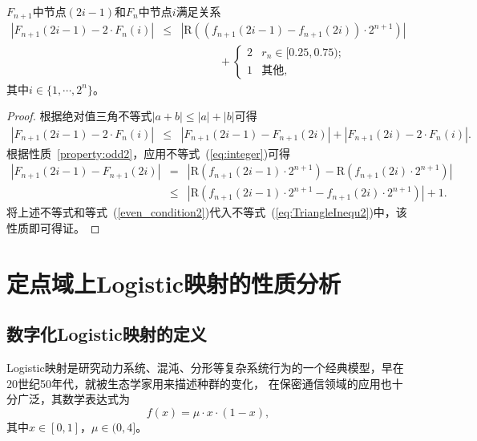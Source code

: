 \begin{Property}
\label{property:odd2}
$F_{n+1}$中节点$(2i-1)$和$F_{n}$中节点$i$满足关系
\begin{eqnarray}
\left|F_{n+1}(2i-1)-2\cdot F_{n}(i)\right|
& \le &    \left|\mathrm{R}\left( (f_{n+1}(2i-1)
                    -f_{n+1}(2i))\cdot 2^{n+1} \right)\right|\nonumber\\
&     &    \hspace{1cm}
\quad+\begin{cases}
2  & r_n\in [0.25, 0.75);\\
1  & \text{其他},
\end{cases}
\end{eqnarray}
其中$i\in \{1, \cdots, 2^n\}$。
\end{Property}
\begin{proof}
根据绝对值三角不等式$|a+b|\le |a|+|b|$可得
\begin{eqnarray}
\left|F_{n+1}(2i\!-\!1)\!-\!2\cdot F_n(i)\right|
& \le &   \left|F_{n+1}(2i\!-\!1)\!-\!F_{n+1}(2i)\right|\!+\!|F_{n+1}(2i)\!-\!2\cdot F_n(i)|.
\label{eq:TriangleInequ2}
\end{eqnarray}
根据性质~\ref{property:odd2}，应用不等式~(\ref{eq:integer})可得
\begin{eqnarray}
\left|F_{n+1}(2i\!-\!1)\!-\!F_{n+1}(2i)\right|
& =   &  \left| \mathrm{R}\left(f_{n+1}(2i\!-\!1)\cdot 2^{n+1}\right)
                \!-\!\mathrm{R}\left(f_{n+1}(2i)\cdot 2^{n+1}\right) \right| \nonumber \\
& \le &  \left| \mathrm{R}\left(f_{n+1}(2i\!-\!1)\cdot 2^{n+1}
                \!-\!f_{n+1}(2i)\cdot 2^{n+1}\right) \right| \!+\!1.  \label{uppound}
\end{eqnarray}
将上述不等式和等式~(\ref{even_condition2})代入不等式~(\ref{eq:TriangleInequ2})中，该性质即可得证。\qedsymbol
\end{proof}

\section{定点域上Logistic映射的性质分析}

\subsection{数字化Logistic映射的定义}

Logistic映射是研究动力系统、混沌、分形等复杂系统行为的一个经典模型，早在20世纪50年代，就被生态学家用来描述种群的变化，
在保密通信领域的应用也十分广泛，其数学表达式为
\begin{equation}
f(x)=\mu\cdot x\cdot (1-x),
\label{eq:logistic}
\end{equation}
其中$x\in [0,1]$，$\mu\in (0,4]$。

